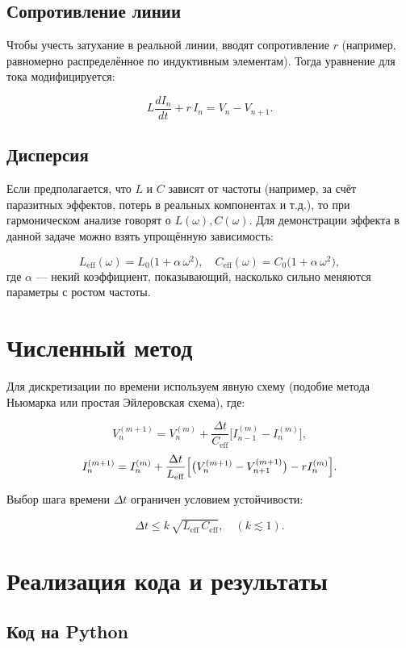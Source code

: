 \documentclass[12pt]{article}
\begin{document}
\subsection{Сопротивление линии}

Чтобы учесть затухание в реальной линии, вводят сопротивление $r$ (например, равномерно распределённое по индуктивным элементам). Тогда уравнение для тока модифицируется:

\[
  L \frac{d I_n}{dt} + r \, I_n = V_n - V_{n+1}.
\]

\subsection{Дисперсия}

Если предполагается, что $L$ и $C$ зависят от частоты (например, за счёт паразитных эффектов, потерь в реальных компонентах и т.д.), то при гармоническом анализе говорят о $L(\omega), C(\omega)$. Для демонстрации эффекта в данной задаче можно взять упрощённую зависимость:

\[
  L_{\mathrm{eff}}(\omega) = L_0 \bigl(1 + \alpha\, \omega^2 \bigr), \quad
  C_{\mathrm{eff}}(\omega) = C_0 \bigl(1 + \alpha\, \omega^2 \bigr),
\]
где $\alpha$ --- некий коэффициент, показывающий, насколько сильно меняются параметры с ростом частоты.

\section{Численный метод}

Для дискретизации по времени используем явную схему (подобие метода Ньюмарка или простая Эйлеровская схема), где:

\[
  V_n^{(m+1)} = V_n^{(m)} + \frac{\Delta t}{C_{\mathrm{eff}}} \bigl[ I_{n-1}^{(m)} - I_n^{(m)} \bigr],
\]
\[
  I_n^{(m+1)} = I_n^{(m)} + \frac{\Delta t}{L_{\mathrm{eff}}} \Bigl[ \bigl(V_n^{(m+1)} - V_{n+1}^{(m+1)}\bigr) - r I_n^{(m)} \Bigr].
\]

Выбор шага времени $\Delta t$ ограничен условием устойчивости:

\[
  \Delta t \le k \, \sqrt{ L_{\mathrm{eff}} \, C_{\mathrm{eff}} }, \quad (k \lesssim 1).
\]

\section{Реализация кода и результаты}

\subsection{Код на Python}
\end{document}
